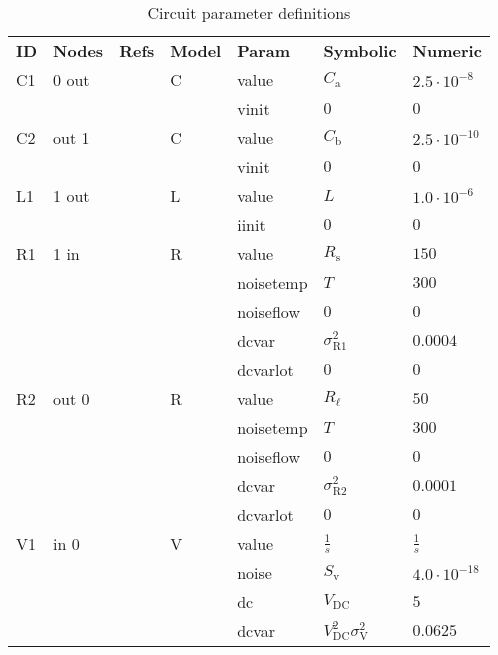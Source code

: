 \begin{table}[H]
\centering
\begin{tabular}[c]{lllllll}
\textbf{ID} & \textbf{Nodes} & \textbf{Refs} & \textbf{Model} & \textbf{Param} & \textbf{Symbolic} & \textbf{Numeric} \\ 
\rowcolor{myyellow}
\small{C1} &\small{0 out } & &\small{C} &\small{value} &$C_{\mathrm{a}}$ &$2.5 \cdot 10^{-8}$ \\ 
 & & & &\small{vinit} &$0$ &$0$ \\ 
\rowcolor{myyellow}
\small{C2} &\small{out 1 } & &\small{C} &\small{value} &$C_{\mathrm{b}}$ &$2.5 \cdot 10^{-10}$ \\ 
 & & & &\small{vinit} &$0$ &$0$ \\ 
\rowcolor{myyellow}
\small{L1} &\small{1 out } & &\small{L} &\small{value} &$L$ &$1.0 \cdot 10^{-6}$ \\ 
 & & & &\small{iinit} &$0$ &$0$ \\ 
\rowcolor{myyellow}
\small{R1} &\small{1 in } & &\small{R} &\small{value} &$R_{\mathrm{s}}$ &$150$ \\ 
 & & & &\small{noisetemp} &$T$ &$300$ \\ 
\rowcolor{myyellow}
 & & & &\small{noiseflow} &$0$ &$0$ \\ 
 & & & &\small{dcvar} &$\sigma_{\mathrm{R1}}^{2}$ &$0.0004$ \\ 
\rowcolor{myyellow}
 & & & &\small{dcvarlot} &$0$ &$0$ \\ 
\small{R2} &\small{out 0 } & &\small{R} &\small{value} &$R_{\ell}$ &$50$ \\ 
\rowcolor{myyellow}
 & & & &\small{noisetemp} &$T$ &$300$ \\ 
 & & & &\small{noiseflow} &$0$ &$0$ \\ 
\rowcolor{myyellow}
 & & & &\small{dcvar} &$\sigma_{\mathrm{R2}}^{2}$ &$0.0001$ \\ 
 & & & &\small{dcvarlot} &$0$ &$0$ \\ 
\rowcolor{myyellow}
\small{V1} &\small{in 0 } & &\small{V} &\small{value} &$\frac{1}{s}$ &$\frac{1}{s}$ \\ 
 & & & &\small{noise} &$S_{\mathrm{v}}$ &$4.0 \cdot 10^{-18}$ \\ 
\rowcolor{myyellow}
 & & & &\small{dc} &$V_{\mathrm{DC}}$ &$5$ \\ 
 & & & &\small{dcvar} &$V_{\mathrm{DC}}^{2} \sigma_{\mathrm{V}}^{2}$ &$0.0625$ \\ 
\end{tabular}
\caption{Circuit parameter definitions}
\label{tab-pardefs}
\end{table}

